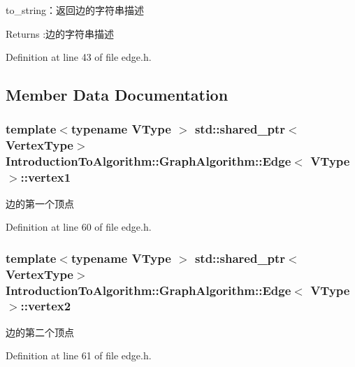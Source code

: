 to\+\_\+string：返回边的字符串描述 

\begin{DoxyReturn}{Returns}
\+:边的字符串描述 
\end{DoxyReturn}


Definition at line 43 of file edge.\+h.



\subsection{Member Data Documentation}
\hypertarget{struct_introduction_to_algorithm_1_1_graph_algorithm_1_1_edge_a634535a3f12be42c3c6ffb6d3c604fb7}{}
\subsubsection[{vertex1}]{\setlength{\rightskip}{0pt plus 5cm}template$<$typename V\+Type $>$ std\+::shared\+\_\+ptr$<${\bf Vertex\+Type}$>$ {\bf Introduction\+To\+Algorithm\+::\+Graph\+Algorithm\+::\+Edge}$<$ V\+Type $>$\+::vertex1}\label{struct_introduction_to_algorithm_1_1_graph_algorithm_1_1_edge_a634535a3f12be42c3c6ffb6d3c604fb7}
边的第一个顶点 

Definition at line 60 of file edge.\+h.

\hypertarget{struct_introduction_to_algorithm_1_1_graph_algorithm_1_1_edge_a762ca9f6ad5abb1adf8b7e1319ea3b52}{}
\subsubsection[{vertex2}]{\setlength{\rightskip}{0pt plus 5cm}template$<$typename V\+Type $>$ std\+::shared\+\_\+ptr$<${\bf Vertex\+Type}$>$ {\bf Introduction\+To\+Algorithm\+::\+Graph\+Algorithm\+::\+Edge}$<$ V\+Type $>$\+::vertex2}\label{struct_introduction_to_algorithm_1_1_graph_algorithm_1_1_edge_a762ca9f6ad5abb1adf8b7e1319ea3b52}
边的第二个顶点 

Definition at line 61 of file edge.\+h.


